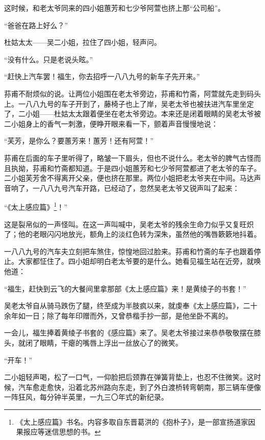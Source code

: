 \par 这时候，和老太爷同来的四小姐蕙芳和七少爷阿萱也挤上那“公司船”。
\par “爸爸在路上好么？”
\par 杜姑太太——吴二小姐，拉住了四小姐，轻声问。
\par “没有什么。只是老说头眩。”
\par “赶快上汽车罢！福生，你去招呼一八八九号的新车子先开来。”
\par 荪甫不耐烦似的说。让两位小姐围在老太爷旁边，荪甫和竹斋，阿萱就先走到码头上。一八八九号的车子开到了，藤椅子也上了岸，吴老太爷也被扶进汽车里坐定了，二小姐——杜姑太太跟着便坐在老太爷旁边。本来还是闭着眼睛的吴老太爷被二小姐身上的香气一刺激，便睁开眼来看一下，颤着声音慢慢地说：
\par “芙芳，是你么？要蕙芳来！蕙芳！还有阿萱！”
\par 荪甫在后面的车子里听得了，略皱一下眉头，但也不说什么。老太爷的脾气古怪而且执拗，荪甫和竹斋都知道。于是四小姐蕙芳和七少爷阿萱都进了老太爷的车子。二小姐芙芳舍不得离开父亲，便也挤在那里。两位小姐把老太爷夹在中间。马达声音响了，一八八九号汽车开路，已经动了，忽然吴老太爷又锐声叫了起来：
\par “《太上感应篇》\footnote{《太上感应篇》书名。内容多取自东晋葛洪的《抱朴子》，是一部宣扬道家因果报应等迷信思想的书。}！”
\par 这是裂帛似的一声怪叫。在这一声叫喊中，吴老太爷的残余生命力似乎又复旺炽了；他的老眼闪闪地放光，额角上的淡红色转为深朱，虽然他的嘴唇簌簌地抖着。
\par 一八八九号的汽车夫立刻把车煞住，惊惶地回过脸来。荪甫和竹斋的车子也跟着停止。大家都怔住了。四小姐却明白老太爷要的是什么。她看见福生站在近旁，就唤他道：
\par “福生，赶快到云飞的大餐间里拿那部《太上感应篇》来！是黄绫子的书套！”
\par 吴老太爷自从骑马跌伤了腿，终至成为半肢疯以来，就虔奉《太上感应篇》，二十余年如一日；除了每年印赠而外，又曾恭楷手抄一部，是他坐卧不离的。
\par 一会儿，福生捧着黄绫子书套的《感应篇》来了。吴老太爷接过来恭恭敬敬摆在膝头，就闭了眼睛，干瘪的嘴唇上浮出一丝放心了的微笑。
\par “开车！”
\par 二小姐轻声喝，松了一口气，一仰脸把后颈靠在弹簧背垫上，也忍不住微笑。这时候，汽车愈走愈快，沿着北苏州路向东走，到了外白渡桥转弯朝南，那三辆车便像一阵狂风，每分钟半英里，一九三〇年式的新纪录。
